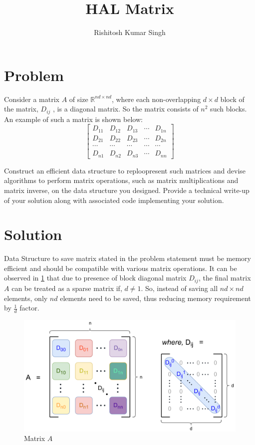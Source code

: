 \documentclass[11pt,twocolumn]{article}
\title{HAL Matrix}
\author{Rishitosh Kumar Singh}
\begin{document}
\maketitle

\section{Problem}
    Consider a matrix $A$ of size $\mathbb{R}^{nd \times nd}$, where each non-overlapping $d \times d$ block of the matrix, $D_{ij}$ , is a diagonal matrix. So the matrix consists of $n^2$ such blocks. An example of such a matrix is shown below:
    \begin{equation}
        \nonumber
        \begin{bmatrix} D_{11} & D_{12} & D_{13} & \cdots & D_{1n} \\ D_{21} & D_{22} & D_{23} & \cdots & D_{2n} \\ \cdots & \cdots & \cdots & \cdots & \cdots \\ D_{n1} & D_{n2} & D_{n3} & \cdots & D_{nn} \end{bmatrix}
    \end{equation}

    Construct an efficient data structure to reploopresent such matrices and devise algorithms to perform matrix operations, such as matrix multiplications and matrix inverse, on the data structure you designed. Provide a technical write-up of your solution along with associated code implementing your solution.

\section{Solution}
    
    Data Structure to save matrix stated in the problem statement must be memory efficient and should be compatible with various matrix operations. It can be observed in \cref{img:matrix} that due to presence of block diagonal matrix $D_{ij}$, the final matrix $A$ can be treated as a sparse matrix if, $d \neq 1$. So, instead of saving all $nd \times nd$ elements, only $nd$ elements need to be saved, thus reducing memory requirement by $\frac{1}{d}$ factor.

    \begin{figure}[H]
        \includegraphics[width=\linewidth]{images/matrix.png}
        \caption{Matrix $A$}
        \label{img:matrix}    
    \end{figure}
\end{document}
